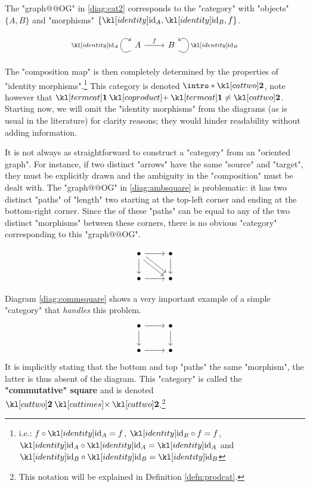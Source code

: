 \documentclass[main.tex]{subfiles}
\begin{document}
\begin{exmps}
	The "graph@@OG" in \eqref{diag:cat2} corresponds to the "category" with "objects" $\{A, B\}$ and "morphisms" $\{\id_A, \id_B, f\}$.
	\begin{equation}\label{diag:cat2}
		\begin{tikzcd}
			A \arrow[r, "f"] \arrow["\id_A", loop, distance=2em, in=145, out=215] & B \arrow["\id_B"', loop, distance=2em, in=35, out=325]
		\end{tikzcd}
	\end{equation}
	The "composition map" is then completely determined by the properties of "identity morphisms".\footnote{i.e.: $f \circ \id_A = f$, $\id_B \circ f = f$, $\id_A \circ \id_A = \id_A$ and $\id_B \circ \id_B = \id_B$} \AP This category is denoted $\intro*\cattwo$, note however that $\termcat \coproduct \termcat \neq \cattwo$. %
	Starting now, we will omit the "identity morphisms" from the diagrams (as is usual in the literature) for clarity reasons; they would hinder readability without adding information.
	
	It is not always as straightforward to construct a "category" from an "oriented graph". For instance, if two distinct "arrows" have the same "source" and "target", they must be explicitly drawn and the ambiguity in the "composition" must be dealt with. The "graph@@OG" in \eqref{diag:ambsquare} is problematic: it has two distinct "paths" of "length" two starting at the top-left corner and ending at the bottom-right corner. Since the  of these "paths" can be equal to any of the two distinct "morphisms" between these corners, there is no obvious "category" corresponding to this "graph@@OG".\begin{marginfigure}[-5\baselineskip]\begin{equation}\label{diag:ambsquare}\begin{tikzcd}
		\bullet \arrow[r] \arrow[d] \arrow[rd, shift left] \arrow[rd, shift right] & \bullet \arrow[d] \\
		\bullet \arrow[r]                                                          & \bullet          
		\end{tikzcd}\end{equation}\end{marginfigure}
	
	Diagram \eqref{diag:commsquare} shows a very important example of a simple "category" that \textit{handles} this problem.
	\begin{equation}\label{diag:commsquare}\begin{tikzcd}
		\bullet \arrow[r] \arrow[d] & \bullet \arrow[d] \\
		\bullet \arrow[r]           & \bullet          
	\end{tikzcd}\end{equation}
	It is implicitly stating that the bottom and top "paths"  the same "morphism", the latter is thus absent of the diagram. This "category" is called the \textbf{"commutative" square} and is denoted $\cattwo \cattimes \cattwo$.\footnote{This notation will be explained in Definition \ref{defn:prodcat}.}
\end{exmps}
\end{document}
